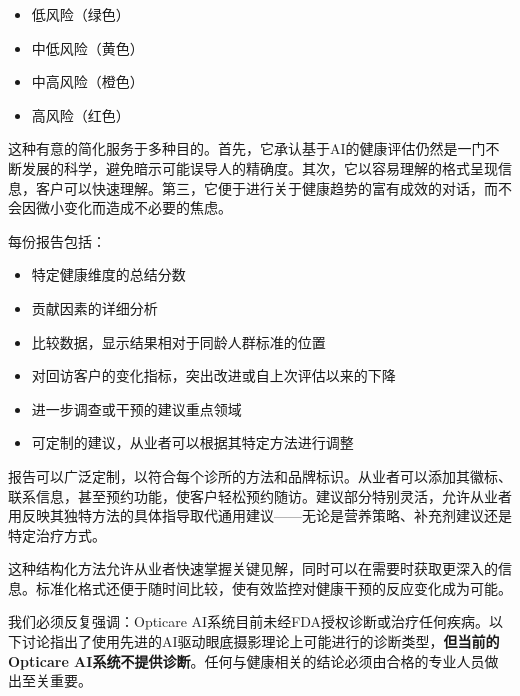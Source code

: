 \documentclass[
  Letterpaper,
]{scrbook}
\providecommand{\tightlist}{%
  \setlength{\itemsep}{0pt}\setlength{\parskip}{0pt}}\usepackage{longtable,booktabs,array}
\begin{document}
\begin{itemize}
\tightlist
\item
  低风险（绿色）
\item
  中低风险（黄色）
\item
  中高风险（橙色）
\item
  高风险（红色）
\end{itemize}

这种有意的简化服务于多种目的。首先，它承认基于AI的健康评估仍然是一门不断发展的科学，避免暗示可能误导人的精确度。其次，它以容易理解的格式呈现信息，客户可以快速理解。第三，它便于进行关于健康趋势的富有成效的对话，而不会因微小变化而造成不必要的焦虑。

每份报告包括：

\begin{itemize}
\tightlist
\item
  特定健康维度的总结分数
\item
  贡献因素的详细分析
\item
  比较数据，显示结果相对于同龄人群标准的位置
\item
  对回访客户的变化指标，突出改进或自上次评估以来的下降
\item
  进一步调查或干预的建议重点领域
\item
  可定制的建议，从业者可以根据其特定方法进行调整
\end{itemize}

报告可以广泛定制，以符合每个诊所的方法和品牌标识。从业者可以添加其徽标、联系信息，甚至预约功能，使客户轻松预约随访。建议部分特别灵活，允许从业者用反映其独特方法的具体指导取代通用建议------无论是营养策略、补充剂建议还是特定治疗方式。

这种结构化方法允许从业者快速掌握关键见解，同时可以在需要时获取更深入的信息。标准化格式还便于随时间比较，使有效监控对健康干预的反应变化成为可能。

\begin{tcolorbox}[enhanced jigsaw, coltitle=black, rightrule=.15mm, colback=white, colbacktitle=quarto-callout-caution-color!10!white, breakable, bottomtitle=1mm, opacityback=0, bottomrule=.15mm, titlerule=0mm, opacitybacktitle=0.6, left=2mm, colframe=quarto-callout-caution-color-frame, title=\textcolor{quarto-callout-caution-color}{\faFire}\hspace{0.5em}{警告：不用于诊断}, toptitle=1mm, toprule=.15mm, arc=.35mm, leftrule=.75mm]

我们必须反复强调：Opticare
AI系统目前未经FDA授权诊断或治疗任何疾病。以下讨论指出了使用先进的AI驱动眼底摄影理论上可能进行的诊断类型，\textbf{但当前的Opticare
AI系统不提供诊断}。任何与健康相关的结论必须由合格的专业人员做出至关重要。

\end{tcolorbox}
\end{document}
